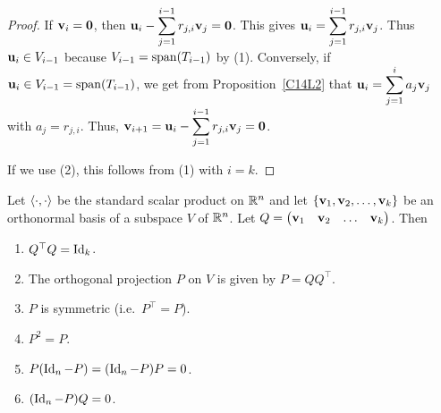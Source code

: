 \begin{proof}
  If $\mathbf{v}_i = \mathbf{0}$, then
$\displaystyle \mathbf{u}_i - \sum_{j=1}^{i-1}r_{j,i}\mathbf{v}_j = \mathbf{0}$.
This gives
$\displaystyle \mathbf{u}_i = \sum_{j=1}^{i-1}r_{j,i}\mathbf{v}_j$.  Thus
$\mathbf{u}_i \in V_{i-1}$ because $V_{i-1} = \operatorname{span}(T_{i-1})$ by (1).
Conversely, if $\mathbf{u}_i \in V_{i-1} = \operatorname{span}(T_{i-1})$, we get from
Proposition~\ref{C14L2} that
$\displaystyle \mathbf{u}_i = \sum_{j=1}^i a_j \mathbf{v}_j$ with
$a_j = r_{j,i}$.  Thus,
$\displaystyle \mathbf{v}_{i+1} = \mathbf{u}_i - \sum_{j=1}^{i-1}r_{j,i}\mathbf{v}_j
= \mathbf{0}$.

 If we use (2), this follows from (1) with $i=k$.
\end{proof}

\begin{prop}
Let $\left\langle{\cdot} , {\cdot}\right\rangle$ be the standard scalar product on $\mathbb{R}^n$ and
let $\{\mathbf{v}_1, \mathbf{v}_2, \ldots , \mathbf{v}_k\}$ be an orthonormal
basis of a subspace $V$ of $\mathbb{R}^n$.  Let
$Q = \begin{pmatrix} \mathbf{v}_1 & \mathbf{v}_2 & \ldots & \mathbf{v}_k 
\end{pmatrix}$.  Then

\begin{enumerate}
\item $Q^\top Q = \operatorname{Id}_k$.  \label{C14L29}
\item The orthogonal projection $P$ on $V$ is given by $P = QQ^\top$.
\item $P$ is symmetric (i.e.\ $P^\top = P$).
\item $P^2 = P$.
\item $P(\operatorname{Id}_n - P) = (\operatorname{Id}_n - P) P = 0$.
\item $(\operatorname{Id}_n - P )Q = 0$.
\end{enumerate}
\label{C14L30}
\end{prop}

